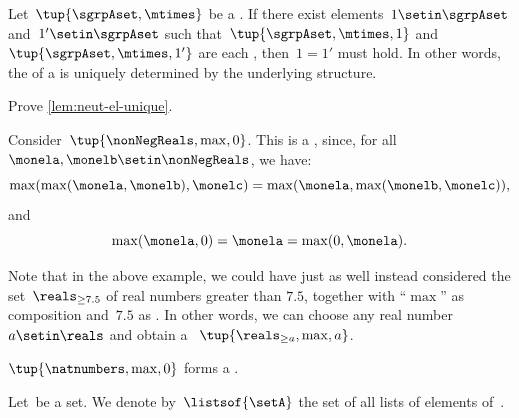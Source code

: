 \begin{lemma}
    \label{lem:neut-el-unique}
    Let~$\tup{\sgrpAset, \mtimes}$ be a .
    If there exist elements~$1 \setin \sgrpAset$ and~$1' \setin \sgrpAset$ such that~$\tup{\sgrpAset, \mtimes, 1}$ and~$\tup{\sgrpAset, \mtimes, 1'}$ are each , then~$1 = 1'$ must hold.
    In other words, the  of a  is uniquely determined by the underlying  structure.
\end{lemma}

\begin{gradedexercise}
    \label{ex:UniqueNeutralMonoid}
    Prove \cref{lem:neut-el-unique}.
\end{gradedexercise}



\begin{example}
    Consider~$\tup{\nonNegReals,\max,0}$.
    This is a , since, for all~$\monela,\monelb\setin \nonNegReals$, we have:
    \begin{equation}
        \max(\max(\monela,\monelb),\monelc)=\max(\monela,\max(\monelb,\monelc)),
    \end{equation}
    and
    \begin{equation}
        \max(\monela,0)=\monela=\max(0,\monela).
    \end{equation}
\end{example}

\begin{remark}
    Note that in the above example, we could have just as well instead considered the set~$\reals_{\geq 7.5}$ of real numbers greater than $7.5$, together with ``$\max$'' as composition and~$7.5$ as .
    In other words, we can choose any real number $a \setin \reals$ and obtain a ~$\tup{\reals_{\geq a},\max, a}$.
\end{remark}

\begin{example}
    $\tup{\natnumbers, {{\max}},0}$ forms a .
\end{example}

\begin{definition}
    \label{def:set-of-lists}
    Let~\setA be a set.
    We denote by~$\listsof{\setA}$ the set of all lists of elements of~\setA.
\end{definition}

